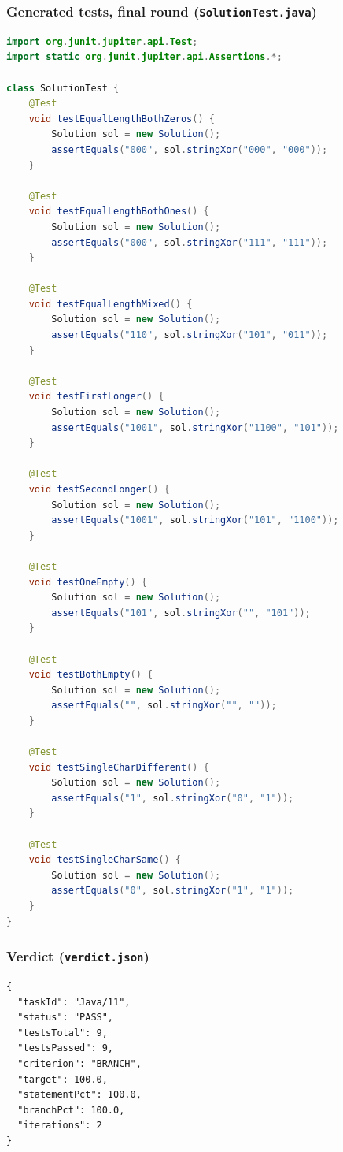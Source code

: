 \documentclass[11pt,a4paper]{article}
\begin{document}
\subsubsection*{Generated tests, final round (\texttt{SolutionTest.java})}
\begin{lstlisting}[language=Java]
import org.junit.jupiter.api.Test;
import static org.junit.jupiter.api.Assertions.*;

class SolutionTest {
    @Test
    void testEqualLengthBothZeros() {
        Solution sol = new Solution();
        assertEquals("000", sol.stringXor("000", "000"));
    }

    @Test
    void testEqualLengthBothOnes() {
        Solution sol = new Solution();
        assertEquals("000", sol.stringXor("111", "111"));
    }

    @Test
    void testEqualLengthMixed() {
        Solution sol = new Solution();
        assertEquals("110", sol.stringXor("101", "011"));
    }

    @Test
    void testFirstLonger() {
        Solution sol = new Solution();
        assertEquals("1001", sol.stringXor("1100", "101"));
    }

    @Test
    void testSecondLonger() {
        Solution sol = new Solution();
        assertEquals("1001", sol.stringXor("101", "1100"));
    }

    @Test
    void testOneEmpty() {
        Solution sol = new Solution();
        assertEquals("101", sol.stringXor("", "101"));
    }

    @Test
    void testBothEmpty() {
        Solution sol = new Solution();
        assertEquals("", sol.stringXor("", ""));
    }

    @Test
    void testSingleCharDifferent() {
        Solution sol = new Solution();
        assertEquals("1", sol.stringXor("0", "1"));
    }

    @Test
    void testSingleCharSame() {
        Solution sol = new Solution();
        assertEquals("0", sol.stringXor("1", "1"));
    }
}
\end{lstlisting}

\subsubsection*{Verdict (\texttt{verdict.json})}
\begin{lstlisting}[language={}]
{
  "taskId": "Java/11",
  "status": "PASS",
  "testsTotal": 9,
  "testsPassed": 9,
  "criterion": "BRANCH",
  "target": 100.0,
  "statementPct": 100.0,
  "branchPct": 100.0,
  "iterations": 2
}
\end{lstlisting}
\end{document}
